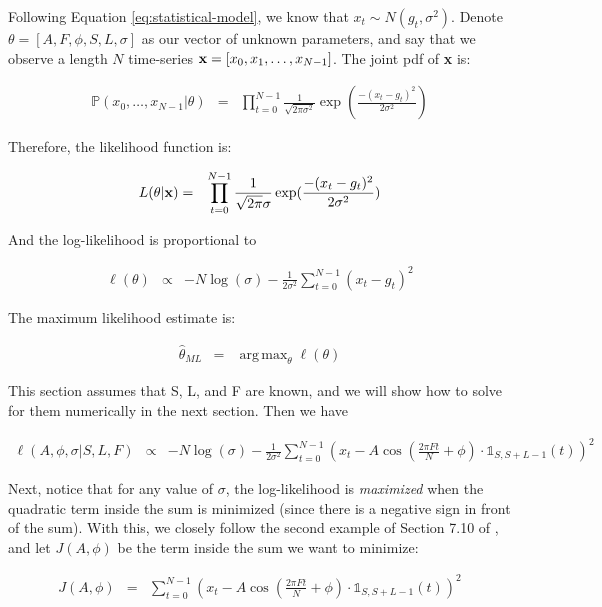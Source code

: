 \documentclass[11pt]{article}
\theoremstyle{plain}
\theoremstyle{definition}
\DeclareMathOperator*{\argmax}{arg\,max}
\begin{document}
Following Equation \ref{eq:statistical-model}, we know that $x_t \sim N(g_t, \sigma^2)$. Denote $\theta = [A, F, \phi, S, L, \sigma]$ as our vector of unknown parameters, and say that we observe a length $N$ time-series ${\bf x} = [x_0, x_1, \ldots, x_{N - 1}]$. The joint pdf of {\bf x} is:

\begin{eqnarray}
\label{eq:jointpdf}
	\mathbb{P}(x_0, \ldots, x_{N - 1} | \theta) &=& \prod_{t=0}^{N-1} \frac{1}{\sqrt{2 \pi \sigma^2}} \exp(\frac{-(x_t - g_t)^2}{2 \sigma^2})
\end{eqnarray}

\noindent Therefore, the likelihood function is:

\begin{eqnarray}
\label{eq:likelihood}
	L(\theta | {\bf x}) &=& \prod_{t=0}^{N-1} \frac{1}{\sqrt{2 \pi} \sigma} \exp(\frac{-(x_t - g_t)^2}{2 \sigma^2})
\end{eqnarray}

\noindent And the log-likelihood is proportional to

\begin{eqnarray}
\label{eq:loglikelihood}
	\ell(\theta) &\propto& -N \log(\sigma) - \frac{1}{2 \sigma^2} \sum_{t=0}^{N-1} (x_t - g_t)^2
\end{eqnarray}

\noindent The maximum likelihood estimate is:

\begin{eqnarray}
	\hat{\theta}_{ML} &=& \argmax_{\theta} \ell(\theta)
\end{eqnarray}

This section assumes that S, L, and F are known, and we will show how to solve for them numerically in the next section. Then we have

\begin{eqnarray}
	\ell(A, \phi, \sigma | S, L, F) &\propto& -N \log(\sigma) - \frac{1}{2 \sigma^2} \sum_{t=0}^{N-1} (x_t - A \cos(\frac{2 \pi F t}{N} + \phi) \cdot \mathbb{1}_{S, S+L-1}(t))^2
\end{eqnarray}

Next, notice that for any value of $\sigma$, the log-likelihood is {\it maximized} when the quadratic term inside the sum is minimized (since there is a negative sign in front of the sum). With this, we closely follow the second example of Section 7.10 of \cite{kay1993fundamentals}, and let $J(A, \phi)$ be the term inside the sum we want to minimize:

\begin{eqnarray}
	J(A, \phi) &=& \sum_{t=0}^{N-1} (x_{t} - A \cos(\frac{2 \pi F t}{N} + \phi) \cdot \mathbb{1}_{S, S+L-1}(t))^2
\end{eqnarray}
\end{document}
